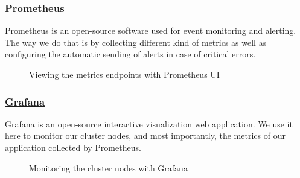 \subsubsection*{\underline{Prometheus}}
Prometheus is an open-source software used for event monitoring and alerting.
The way we do that is by collecting different kind of metrics as well as configuring the automatic sending of alerts in case of critical errors.
\begin{figure}[H]
    \centering
    \caption{Viewing the metrics endpoints with Prometheus UI}
    \label{fig:prometheus-ui-metrics-endpoint}
\end{figure}

\subsubsection*{\underline{Grafana}}
Grafana is an open-source interactive visualization web application.
We use it here to monitor our cluster nodes, and most importantly, the metrics of our application collected by Prometheus.
\begin{figure}[H]
    \centering
    \caption{Monitoring the cluster nodes with Grafana}
    \label{fig:grafana-node-monitoring}
\end{figure}

